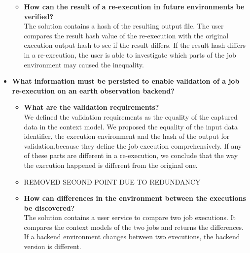 \documentclass[draft,final]{vutinfth} %
\newcommand{\bgoesswe}[1]{#1}
\begin{document}
\begin{itemize}
\begin{itemize}
		\item \textbf{How can the result of a re-execution in future environments be verified?} \\
		The solution contains a hash of the resulting output file. The user compares the result hash value of the re-execution with the original execution output hash to see if the result differs. \bgoesswe{If the result hash differs in a re-execution, the user is able to investigate which parts of the job environment may caused the inequality.}
	\end{itemize}
\newpage
	\item \textbf{What information must be persisted to enable validation of a job re-execution on \bgoesswe{an} earth observation backend?}
	\begin{itemize}
		\item \textbf{What are the validation requirements?} \\
		We defined the validation requirements as the equality of the captured data in the context model. We proposed the equality of the input data identifier, the execution environment and the hash of the output for validation,\bgoesswe{because they define the job execution comprehensively. If any of these parts are different in a re-execution, we conclude that the way the execution happened is different from the original one.}
		\item \bgoesswe{REMOVED SECOND POINT DUE TO REDUNDANCY}  
		\item \textbf{How can differences in the environment between the executions be discovered?} \\
		The solution contains a user service to compare two job executions. It compares the context models of the two jobs and returns the differences. If a backend environment changes between two executions, the backend version is different.
	\end{itemize}
\end{itemize}
\end{document}
